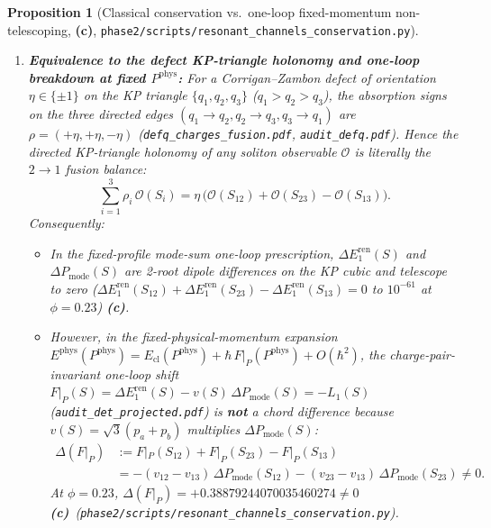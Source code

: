 \documentclass[11pt,a4paper]{article}
\newcommand{\Lc}{\textsf{\textbf{(c)}}\xspace}
\newcommand{\hb}{\hbar}
\newcommand{\scons}{\texttt{phase2/\allowbreak scripts/\allowbreak resonant\_\allowbreak channels\_\allowbreak conservation.py}}
\newtheorem{proposition}{Proposition}[section]
\theoremstyle{remark}
\begin{document}
\begin{proposition}[Classical conservation vs.\ one-loop fixed-momentum non-telescoping, \Lc, \scons]
\begin{enumerate}
\item \textbf{Equivalence to the defect KP-triangle holonomy and one-loop breakdown at fixed $P^{\mathrm{phys}}$:}
For a Corrigan--Zambon defect of orientation $\eta\in\{\pm 1\}$ on the KP
triangle $\{q_1,q_2,q_3\}$ ($q_1>q_2>q_3$), the absorption signs on the three
directed edges $(q_1\to q_2,q_2\to q_3,q_3\to q_1)$ are
$\rho = (+\eta,+\eta,-\eta)$ (\texttt{defq\_charges\_fusion.pdf},
\texttt{audit\_defq.pdf}). Hence the directed KP-triangle holonomy of any
soliton observable $\mathcal{O}$ is literally the $2\to 1$ fusion balance:
\begin{equation}\label{eq:holonomy_is_fusion}
  \sum_{i=1}^3 \rho_i\,\mathcal{O}(S_i)
  = \eta\,\Big(\mathcal{O}(S_{12}) + \mathcal{O}(S_{23}) - \mathcal{O}(S_{13})\Big).
\end{equation}
Consequently:
\begin{itemize}
\item In the \emph{fixed-profile mode-sum} one-loop prescription,
$\Delta E_1^{\mathrm{ren}}(S)$ and $\Delta P_{\mathrm{mode}}(S)$ are 2-root
dipole differences on the KP cubic and telescope to zero
($\Delta E_1^{\mathrm{ren}}(S_{12})+\Delta E_1^{\mathrm{ren}}(S_{23})-\Delta E_1^{\mathrm{ren}}(S_{13}) = 0$
to $10^{-61}$ at $\phi=0.23$) \Lc.
\item However, in the \emph{fixed-physical-momentum} expansion
$E^{\mathrm{phys}}(P^{\mathrm{phys}}) = E_{\mathrm{cl}}(P^{\mathrm{phys}}) + \hb\,F|_P(P^{\mathrm{phys}}) + O(\hb^2)$,
the charge-pair-invariant one-loop shift
$F|_P(S) = \Delta E_1^{\mathrm{ren}}(S) - v(S)\,\Delta P_{\mathrm{mode}}(S) = -L_1(S)$
(\texttt{audit\_det\_projected.pdf}) is \textbf{not} a chord difference because
$v(S) = \sqrt{3}(p_a+p_b)$ multiplies $\Delta P_{\mathrm{mode}}(S)$:
\begin{align}\label{eq:delta_F_at_P}
  \Delta(F|_P) &:= F|_P(S_{12}) + F|_P(S_{23}) - F|_P(S_{13}) \nonumber\\
  &= -(v_{12}-v_{13})\,\Delta P_{\mathrm{mode}}(S_{12}) - (v_{23}-v_{13})\,\Delta P_{\mathrm{mode}}(S_{23}) \ne 0.
\end{align}
At $\phi = 0.23$, $\Delta(F|_P) = +0.38879244070035460274 \ne 0$ \Lc\ (\scons).
\end{itemize}
\end{enumerate}
\end{proposition}
\end{document}
